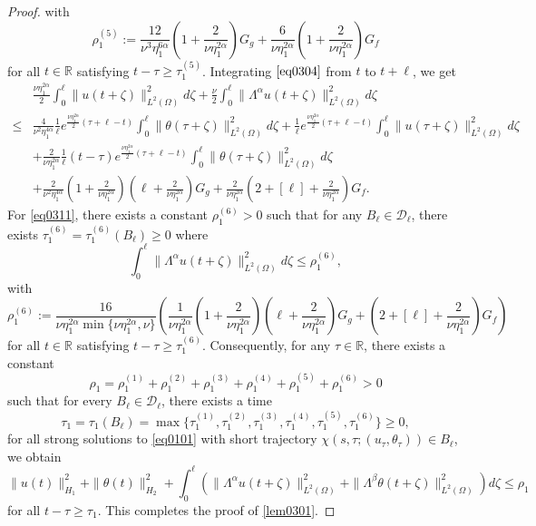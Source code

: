 \documentclass[10pt,a4paper]{amsart}
\begin{document}
\begin{proof}
with
\[
    \rho_{1}^{(5)} 
    := \frac{12}{\nu^{3}\eta_1^{6\alpha}} 
   \left(1+\frac{2}{\nu\eta_1^{2\alpha}}\right)
   G_g
   + \frac{6}{\nu\eta_1^{2\alpha}} \left(1+\frac{2}{\nu\eta_1^{2\alpha}}\right)G_f
\]
for all $t \in \mathbb{R}$ satisfying $t - \tau \geq \tau_{1}^{(5)}$. Integrating $\eqref{eq0304}$ from $t$ to $t+\ell$, we get
\begin{equation}\label{eq0311}
\begin{aligned}
  &\frac{\nu\eta_1^{2\alpha}}{2} \int_{0}^{\ell} \|u(t+\zeta)\|_{L^2(\Omega)}^2 d\zeta + \frac{\nu}{2} \int_{0}^{\ell} \| \Lambda^\alpha u(t+\zeta)\|_{L^2(\Omega)}^2 d\zeta \\
  \leq 
  & 
  \frac{4}{\nu^{2}\eta_1^{4\alpha}} \frac{1}{\ell} e^{\frac{\nu\eta_1^{2\alpha}}{2}(\tau+\ell-t)} \int_{0}^{\ell} \|\theta(\tau+\zeta)\|_{L^2(\Omega)}^2 d\zeta
  + \frac{1}{\ell} e^{\frac{\nu\eta_1^{2\alpha}}{2}(\tau+\ell-t)}  \int_{0}^{\ell} \|u(\tau+\zeta)\|_{L^2(\Omega)}^2 d\zeta \\
  &
  + \frac{2}{\nu\eta_1^{2\alpha}}
   \frac{1}{\ell}(t-\tau)
   e^{\frac{\nu\eta_1^{2\alpha}}{2}(\tau+\ell-t)}
   \int_{0}^{\ell} 
   \|\theta(\tau+\zeta)\|_{L^2(\Omega)}^2  d\zeta \\
  &
  + \frac{2}{\nu^{2}\eta_1^{4\alpha}} 
  \left(1+\frac{2}{\nu\eta_1^{2\alpha}}\right)
  \left(\ell+\frac{2}{\nu\eta_1^{2\alpha}}\right)
  G_g
  + \frac{2}{\nu\eta_1^{2\alpha}} \left(2+[\ell]+\frac{2}{\nu\eta_1^{2\alpha}}\right)G_f.
\end{aligned}
\end{equation}
For \cref{eq0311}, there exists a constant $\rho_{1}^{(6)} > 0$ such that for any $B_{\ell} \in \mathcal{D}_{\ell}$, there exists $\tau_{1}^{(6)} = \tau_{1}^{(6)}(B_{\ell}) \geq 0$ where  
\begin{equation}\label{eq0312}
    \int_{0}^{\ell} \| \Lambda^\alpha u(t+\zeta)\|_{L^2(\Omega)}^2 d\zeta
    \leq 
    \rho_{1}^{(6)},
\end{equation}
with
\[
    \rho_{1}^{(6)} 
    := 
    \frac{16}{\nu\eta_1^{2\alpha}\min\{\nu\eta_1^{2\alpha},\nu\}}
    \left(
    \frac{1}{\nu\eta_1^{2\alpha}} 
    \left(1+\frac{2}{\nu\eta_1^{2\alpha}}\right)
    \left(\ell+\frac{2}{\nu\eta_1^{2\alpha}}\right)
    G_g
    + \left(2+[\ell]+\frac{2}{\nu\eta_1^{2\alpha}}\right)G_f
    \right)
\]
for all $t \in \mathbb{R}$ satisfying $t - \tau \geq \tau_{1}^{(6)}$.
Consequently, for any $\tau \in \mathbb{R}$, there exists a constant 
$$
\rho_1=\rho_{1}^{(1)}+\rho_{1}^{(2)}+\rho_{1}^{(3)}+
\rho_{1}^{(4)}+\rho_{1}^{(5)}+\rho_{1}^{(6)}>0
$$
such that for every $B_{\ell} \in \mathcal{D}_{\ell}$, there exists a time 
$$
\tau_1 =\tau_1(B_{\ell})=\max\{\tau_{1}^{(1)},
            \tau_{1}^{(2)},
            \tau_{1}^{(3)},
            \tau_{1}^{(4)},
            \tau_{1}^{(5)},
            \tau_{1}^{(6)}\}\geq 0 ,
$$
for all strong solutions to \cref{eq0101} with short trajectory $\chi(s,\tau; (u_\tau, \theta_\tau)) \in B_{\ell}$, we obtain
\[
\| u(t) \|_{H_{1}}^{2}
+ \| \theta(t) \|_{H_{2}}^{2}
+ \int_{0}^{\ell} \left(
\| \Lambda^\alpha u(t+\zeta)\|_{L^2(\Omega)}^2 + \| \Lambda^\beta \theta(t+\zeta)\|_{L^2(\Omega)}^2 \right) d\zeta
\leq \rho_1 
\]%
for all $t-\tau \geq \tau_1$. This completes the proof of \cref{lem0301}.
\end{proof}
\end{document}

